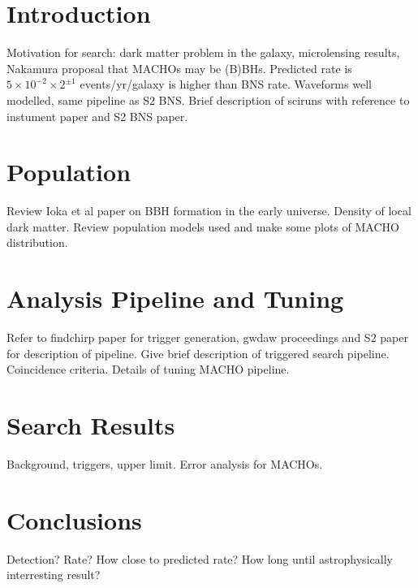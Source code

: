 
\section{Introduction}

Motivation for search: dark matter problem in the galaxy, microlensing
results, Nakamura proposal that MACHOs may be (B)BHs. Predicted rate is
$5\times10^{-2}\times2^{\pm 1}$ events/yr/galaxy is higher than BNS rate.
Waveforms well modelled, same pipeline as S2 BNS. Brief description of sciruns
with reference to instument paper and S2 BNS paper.

\section{Population}

Review Ioka et al paper on BBH formation in the early universe. Density of
local dark matter. Review population models used and make some plots of MACHO
distribution.

\section{Analysis Pipeline and Tuning}

Refer to findchirp paper for trigger generation, gwdaw proceedings and S2
paper for description of pipeline. Give brief description of triggered search
pipeline. Coincidence criteria. Details of tuning MACHO pipeline.

\section{Search Results}

Background, triggers, upper limit. Error analysis for MACHOs.

\section{Conclusions}

Detection? Rate? How close to predicted rate? How long until astrophysically
interresting result?

